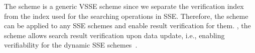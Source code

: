  The \name scheme is a generic VSSE scheme since we separate the verification index from the index used for the searching operations in SSE. Therefore, the scheme can be applied to any SSE schemes and enable result verification for them. , the \name scheme allows search result verification upon data update, i.e., enabling verifiability for the dynamic SSE schemes~\cite{kamara2012dynamic,cash2014dynamic,stefanov2014practical}.



